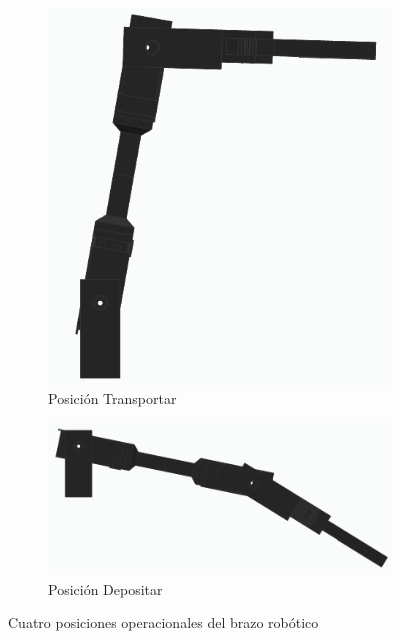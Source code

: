 \begin{figure}[H]
    \begin{subfigure}[b]{0.45\textwidth}
        \centering
        \includegraphics[width=\textwidth]{imagenes/brazo_transportar.png}
        \caption{Posición Transportar}
    \end{subfigure}
    \hfill
    \begin{subfigure}[b]{0.45\textwidth}
        \centering
        \includegraphics[width=\textwidth]{imagenes/brazo_depositar.png}
        \caption{Posición Depositar}
    \end{subfigure}
    \caption{Cuatro posiciones operacionales del brazo robótico}
    \label{fig:posiciones_brazo}
\end{figure}

